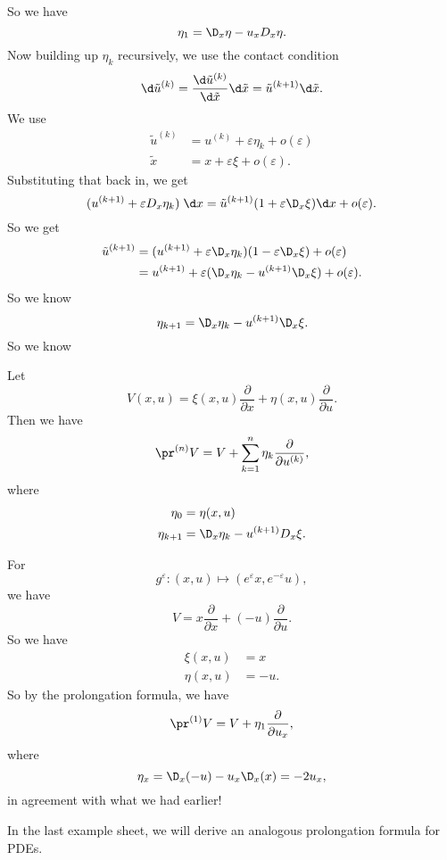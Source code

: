 \documentclass[a4paper]{article}
\begin{document}
So we have
\[
  \eta_1 = \D_x \eta - u_x D_x \eta.
\]
Now building up $\eta_k$ recursively, we use the contact condition
\[
  \d \tilde{u}^{(k)} = \frac{\d \tilde{u}^{(k)}}{\d \tilde{x}}\d \tilde{x} = \tilde{u}^{(k + 1)} \d \tilde{x}.
\]
We use
\begin{align*}
  \tilde{u}^{(k)} &= u^{(k)} + \varepsilon \eta_k + o(\varepsilon)\\
  \tilde{x} &= x + \varepsilon \xi + o(\varepsilon).
\end{align*}
Substituting that back in, we get
\[
  (u^{(k + 1)} + \varepsilon D_x \eta_k) \;\d x = \tilde{u}^{(k + 1)} (1 + \varepsilon \D_x \xi) \d x + o(\varepsilon).
\]
So we get
\begin{align*}
  \tilde{u}^{(k + 1)} &= (u^{(k + 1)} + \varepsilon \D_x \eta_k) (1 - \varepsilon \D_x \xi) + o(\varepsilon)\\
  &= u^{(k + 1)} + \varepsilon(\D_x \eta_k - u^{(k + 1)} \D_x \xi) + o(\varepsilon).
\end{align*}
So we know
\[
  \eta_{k + 1} = \D_x \eta_k - u^{(k + 1)} \D_x \xi.
\]
So we know
\begin{prop}
  Let
  \[
    V(x, u) = \xi(x, u) \frac{\partial}{\partial x} + \eta(x, u) \frac{\partial}{\partial u}.
  \]
  Then we have
  \[
    \pr^{(n)}V = V + \sum_{k = 1}^n \eta_k\frac{\partial}{\partial u^{(k)}},
  \]
  where
  \begin{align*}
    \eta_0 &= \eta(x, u)\\
    \eta_{k + 1} &= \D_x \eta_k - u^{(k + 1)} D_x \xi.
  \end{align*}
\end{prop}

\begin{eg}
  For
  \[
    g^\varepsilon: (x, u) \mapsto (e^\varepsilon x, e^{-\varepsilon}u),
  \]
  we have
  \[
    V = x \frac{\partial}{\partial x} + (-u) \frac{\partial}{\partial u}.
  \]
  So we have
  \begin{align*}
    \xi(x, u) &= x\\
    \eta(x, u) &= -u.
  \end{align*}
  So by the prolongation formula, we have
  \[
    \pr^{(1)}V = V + \eta_1 \frac{\partial}{\partial u_x},
  \]
  where
  \[
    \eta_x = \D_x (-u) - u_x \D_x(x) = -2 u_x,
  \]
  in agreement with what we had earlier!
\end{eg}

In the last example sheet, we will derive an analogous prolongation formula for PDEs.
\end{document}
